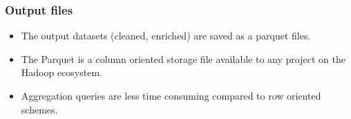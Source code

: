 \documentclass{beamer}
\begin{document}
\begin{frame}
\frametitle{Output files}
\begin{itemize}
\item The output datasets (cleaned, enriched) are saved as a parquet files.
\item The Parquet is a column oriented storage file available to any project on the Hadoop ecosystem.
\item Aggregation queries are less time consuming compared to row oriented schemes. 
\end{itemize}
\end{frame}
\end{document}
